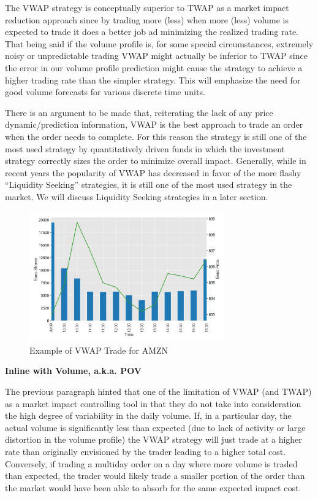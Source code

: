 The VWAP strategy is conceptually superior to TWAP as a market impact reduction approach since by trading more (less) when more  (less) volume is expected to trade it does a better job ad minimizing the realized trading rate. That being said if the volume profile is, for some special circumstances, extremely noisy or unpredictable trading VWAP might actually be inferior to TWAP since the error in our volume profile prediction might cause the strategy to achieve a higher trading rate than the simpler strategy. This will emphasize the need for good volume forecasts for various discrete time units.

There is an argument to be made that, reiterating the lack of any price dynamic/prediction information, VWAP is the best approach to trade an order when the order needs to complete. For this reason the strategy is still one of the most used strategy by quantitatively driven funds in which the investment strategy correctly sizes the order to minimize overall impact. Generally, while in recent years the popularity of VWAP has decreased in favor of the more flashy ``Liquidity Seeking'' strategies, it is still one of the most used strategy in the market. We will discuss Liquidity Seeking strategies in a later section. \twomedskip


        \begin{figure}[!ht]
        \centering
        \includegraphics[width=0.75\textwidth]{chapters/chapter_exec_models/figures/vwap.png} 
        \caption{Example of VWAP Trade for AMZN\label{fig:vwap}}
        \end{figure}


\noindent\textbf{Inline with Volume, a.k.a. POV} \twomedskip


The previous paragraph hinted that one of the limitation of VWAP (and TWAP) as a market impact controlling tool in that they do not take into consideration the high degree of variability in the daily volume. If, in a particular day, the actual volume is significantly less than expected (due to lack of activity or large distortion in the volume profile) the VWAP strategy will just trade at a higher rate than originally envisioned by the trader leading to a higher total cost. Conversely, if trading a multiday order on a day where more volume is traded than expected, the trader would likely trade a smaller portion of the order than the market would have been able to absorb for the same expected impact cost.


